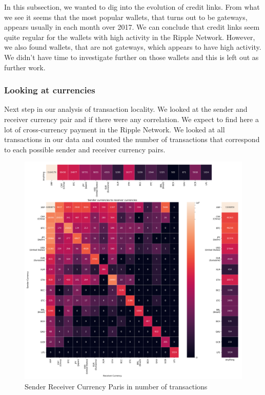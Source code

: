 In this subsection, we wanted to dig into the evolution of credit links. From what we see it seems that the most popular wallets, that turns out to be gateways, appears usually in each month over 2017. We can conclude that credit links seem quite regular for the wallets with high activity in the Ripple Network. However, we also found wallets, that are not gateways, which appears to have high activity. We didn't have time to investigate further on those wallets and this is left out as further work.
\newpage
\subsubsection{Looking at currencies}
Next step in our analysis of transaction locality. We looked at the sender and receiver currency pair and if there were any correlation. We expect to find here a lot of cross-currency payment in the Ripple Network. We looked at all transactions in our data and counted the number of transactions that correspond to each possible sender and receiver currency pairs.
\begin{figure}[h!]
    \centering
    \includegraphics[width = \linewidth]{sender_to_receiver_heatmap.png}
    \caption{Sender Receiver Currency Paris in number of transactions}
    \label{fig:heatmapNbTxns}
\end{figure}
